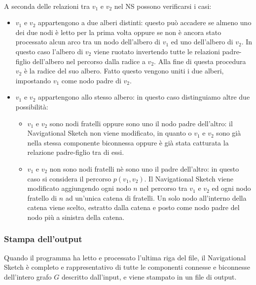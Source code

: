 \documentclass[a4paper,11pt]{report}
\begin{document}
\paragraph{}
A seconda delle relazioni tra $v_1$ e $v_2$ nel NS possono verificarsi i casi:
\begin{itemize}
 \item $v_1$ e $v_2$ appartengono a due alberi distinti: questo può accadere se almeno uno dei due nodi è letto per la prima volta oppure se
non è ancora stato
processato alcun arco tra un nodo dell'albero di $v_1$ ed uno dell'albero di $v_2$. In questo caso l'albero di $v_2$ viene ruotato
invertendo tutte le relazioni padre-figlio
dell'albero nel percorso dalla radice a $v_2$. Alla fine di questa procedura $v_2$ è la radice del suo albero. Fatto questo vengono uniti i
due alberi, impostando $v_1$ come nodo
padre di $v_2$.
 \item $v_1$ e $v_2$ appartengono allo stesso albero: in questo caso distinguiamo altre due possibilità:
 \begin{itemize}
  \item $v_1$ e $v_2$ sono nodi fratelli oppure sono uno il nodo padre dell'altro: il Navigational Sketch non viene modificato, in quanto o
$v_1$ e $v_2$ sono già nella stessa
componente biconnessa oppure è già stata catturata la relazione padre-figlio tra di essi.
  \item $v_1$ e $v_2$ non sono nodi fratelli nè sono uno il padre dell'altro: in questo caso si considera il percorso
$p\left(v_1,v_2\right)$. Il Navigational Sketch viene modificato
   aggiungendo ogni nodo $n$ nel percorso tra $v_1$ e $v_2$ ed ogni nodo fratello di $n$ ad un'unica catena di fratelli. Un solo nodo
all'interno della catena viene scelto, estratto
dalla catena e posto come nodo padre del nodo più a sinistra della catena.
 \end{itemize}
\end{itemize}
\subsubsection{Stampa dell'output}
Quando il programma ha letto e processato l'ultima riga del file, il Navigational Sketch è completo e rappresentativo di tutte le componenti
connesse e biconnesse dell'intero grafo $G$
descritto dall'input, e viene stampato in un file di output.
\end{document}
